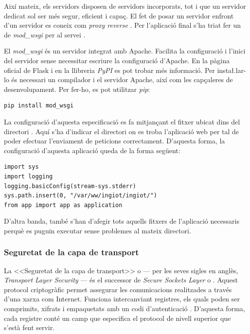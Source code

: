 \documentclass{tfgitic}[2022/06/30]
\begin{document}
Així mateix, els servidors  disposen de servidors  incorporats, tot i que un servidor  dedicat sol ser més segur, eficient i capaç. El fet de posar un servidor  enfront d'un servidor  es coneix com \emph{proxy reverse} \cite{flask:flask}. Per l'aplicació final s'ha triat fer un de \emph{mod\_wsgi} per al servei .

El \emph{mod\_wsgi} és un servidor  integrat amb Apache. Facilita la configuració i l'inici del servidor sense necessitar escriure la configuració d'Apache. En la pàgina oficial de Flask i en la llibreria \emph{PyPI} es pot trobar més informació. Per insta\l.lar-lo és necessari un compilador i el servidor Apache, així com les capçaleres de desenvolupament. Per fer-ho, es pot utilitzar \emph{pip}:

\begin{lstlisting}[style = bash]
pip install mod_wsgi
\end{lstlisting}

La configuració d'aquesta especificació es fa mitjançant el fitxer  ubicat dins del directori . Aquí s'ha d'indicar el directori on es troba l'aplicació web per tal de poder efectuar l'enviament de peticions correctament. D'aquesta forma, la configuració  d'aquesta aplicació queda de la forma següent:

\begin{lstlisting}[style = python]
import sys
import logging
logging.basicConfig(stream-sys.stderr)
sys.path.insert(0, "/var/ww/ingiot/ingiot/")
from app import app as application
\end{lstlisting}

D'altra banda, també s'han d'afegir tots aquells fitxers de l'aplicació necessaris perquè es puguin executar sense problemes al mateix directori.

\subsubsection{Seguretat de la capa de transport}
\label{ssl}

La <<Seguretat de la capa de transport>> o  --- per les seves sigles en anglès, \emph{Transport Layer Security} --- és el successor de \emph{Secure Sockets Layer} o . Aquest protocol criptogràfic permet assegurar les comunicacions realitzades a través d'una xarxa com Internet. Funciona intercanviant registres, els quals poden ser comprimits, xifrats i empaquetats amb un codi d'autenticació . D'aquesta forma, cada registre conté un camp  que especifica el protocol de nivell superior que s'està fent servir.
\end{document}
